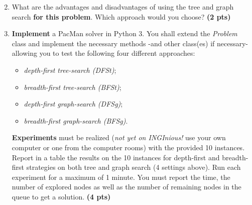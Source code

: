 \documentclass[11pt,a4paper]{../template/report}
\begin{document}
\begin{answer}
\end{answer}



\begin{enumerate}
\setcounter{enumi}{1}
\begin{enumerate}
\setcounter{enumii}{1}
    \item What are the advantages and disadvantages of using the tree and graph search \textbf{for this problem}. Which approach would you choose? \textbf{(2 pts)}
\end{enumerate}
\end{enumerate}

\begin{answers}[4cm]
\end{answers}



\begin{enumerate}
\setcounter{enumi}{2}
    \item \textbf{Implement} a PacMan solver in Python 3.
			You shall extend the \emph{Problem} class and implement the necessary methods -and other class(es) if necessary- allowing you to test the following four different approaches: 
			\begin{itemize}
			\item \textit{depth-first tree-search (DFSt)};
			\item \textit{breadth-first tree-search (BFSt)};
			\item \textit{depth-first graph-search (DFSg)};
			\item \textit{breadth-first graph-search (BFSg)}. 
			\end{itemize}

    \textbf{Experiments} must be realized (\textit{not yet on INGInious!} use your own computer or one from the computer rooms) with the provided 10 instances. Report in a table the results on the 10 instances for depth-first and breadth-first strategies on both tree and graph search (4 settings above). Run each experiment for a maximum of 1 minute. You must report the time, the number of explored nodes as well as the number of remaining nodes in the queue to get a solution. \textbf{(4 pts)}
\end{enumerate}
\end{document}
